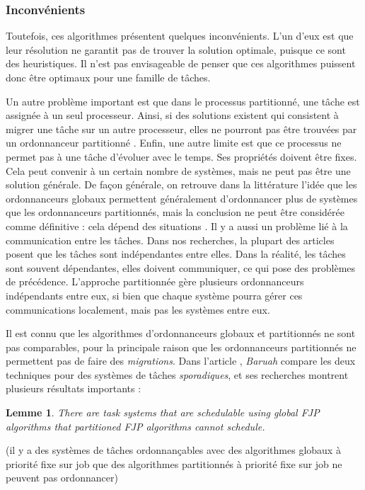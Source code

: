 \documentclass[11pt,a4paper,oneside]{report}
\newtheorem{mylemme}{Lemme}
\begin{document}
	\subsubsection{Inconvénients}
	Toutefois, ces algorithmes présentent quelques inconvénients. 
	L'un d'eux est que leur résolution ne garantit pas de trouver la solution optimale, 
	puisque ce sont des heuristiques. 
	Il n'est pas envisageable de penser 
	que ces algorithmes puissent donc être optimaux pour une famille de tâches.
	
	Un autre problème important est que dans le processus partitionné, une tâche est 
	assignée à un seul processeur. 
	Ainsi, si des solutions existent qui consistent à migrer une tâche sur un autre processeur, 
	elles ne pourront pas être trouvées 
	par un ordonnanceur partitionné \cite{ramamurthy_static-priority_2000}. 
	Enfin, une autre limite est que ce processus ne permet pas à une tâche d'évoluer avec le temps. 
	Ses propriétés doivent être fixes. 
	Cela peut convenir à un certain nombre de systèmes, mais ne peut pas être une solution générale.
	De façon générale, on retrouve dans la littérature l'idée que les ordonnanceurs globaux 
	permettent généralement d'ordonnancer plus de systèmes que les ordonnanceurs partitionnés, 
	mais la conclusion ne peut être considérée comme définitive : cela dépend des situations
	\cite{lopez_utilization_2004}.
	Il y a aussi un problème lié à la communication entre les tâches. Dans nos recherches, 
	la plupart des articles posent que les tâches sont indépendantes entre elles. Dans 
	la réalité, les tâches sont souvent dépendantes, elles doivent communiquer, ce qui pose 
	des problèmes de précédence. 
	L'approche partitionnée gère plusieurs ordonnanceurs indépendants entre eux, si bien 
	que chaque système pourra gérer ces communications localement, mais pas les systèmes entre eux. 
	\medskip
	
	Il est connu que les algorithmes d'ordonnanceurs globaux et partitionnés ne sont pas comparables, 
	pour la principale raison que les ordonnanceurs partitionnés ne permettent pas de faire des 
	\textit{migrations}. Dans l'article \cite{baruah_techniques_2007}, \textit{Baruah} 
	compare les deux techniques pour des systèmes de tâches \textit{sporadiques}, et 
	ses recherches montrent plusieurs résultats importants :\medskip
	\begin{mylemme}
		There are task systems that are schedulable using global FJP algorithms that partitioned FJP algorithms cannot schedule.
	\end{mylemme}
	(il y a des systèmes de tâches ordonnançables avec des algorithmes globaux à priorité fixe 
	sur job que des algorithmes partitionnés à priorité fixe sur job ne peuvent pas ordonnancer)\medskip
	
\end{document}

